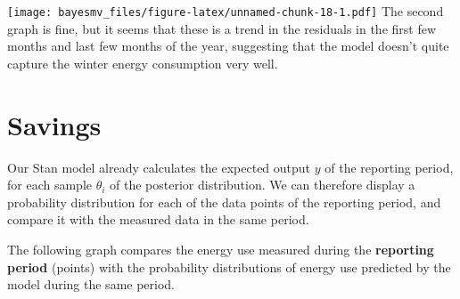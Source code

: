 \documentclass[
]{article}
\begin{document}
\texttt{[image: bayesmv\_files/figure-latex/unnamed-chunk-18-1.pdf]}
The second graph is fine, but it seems that these is a trend in the residuals in the first few months and last few months of the year, suggesting that the model doesn't quite capture the winter energy consumption very well.

\hypertarget{savings}{%
\section{Savings}\label{savings}}

Our Stan model already calculates the expected output \(y\) of the reporting period, for each sample \(\theta_i\) of the posterior distribution. We can therefore display a probability distribution for each of the data points of the reporting period, and compare it with the measured data in the same period.

The following graph compares the energy use measured during the \textbf{reporting period} (points) with the probability distributions of energy use predicted by the model during the same period.
\end{document}
